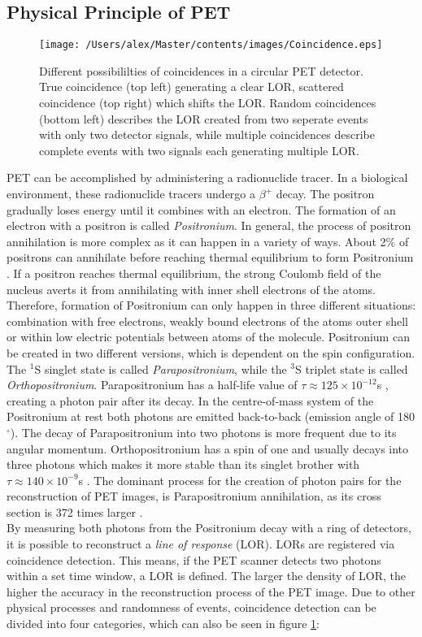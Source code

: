\subsection{Physical Principle of PET}
\begin{figure}[htp]
\centering
\texttt{[image: /Users/alex/Master/contents/images/Coincidence.eps]}
\vspace{1cm}
\caption{Different possibililties of coincidences in a circular PET detector. True coincidence (top left) generating a clear LOR, scattered coincidence (top right) which shifts the LOR. Random coincidences (bottom left) describes the LOR created from two seperate events with only two detector signals, while multiple coincidences describe complete events with two signals each generating multiple LOR.}
\label{fig:coincidence}
\end{figure}
PET can be accomplished by administering a radionuclide tracer. In a biological environment, these radionuclide tracers undergo a $\beta^+$ decay. The positron gradually loses energy until it combines with an electron. The formation of an electron with a positron is called \textit{Positronium}. In general, the process of positron annihilation is more complex as it can happen in a variety of ways. About 2\% of positrons can annihilate before reaching thermal equilibrium to form Positronium \cite{Heitler}. If a positron reaches thermal equilibrium, the strong Coulomb field of the nucleus averts it from annihilating with inner shell electrons of the atoms. Therefore, formation of Positronium can only happen in three different situations: combination with free electrons, weakly bound electrons of the atoms outer shell or within low electric potentials between atoms of the molecule. Positronium can be created in two different versions, which is dependent on the spin configuration. The $^1$S singlet state is called \textit{Parapositronium}, while the $^3$S triplet state is called \textit{Orthopositronium}. Parapositronium has a half-life value of $\tau  \approx 125 \times 10^{-12}$s \cite{PDG}, creating a photon pair after its decay. In the centre-of-mass system of the Positronium at rest both photons are emitted back-to-back (emission angle of 180$^\circ$). The decay of Parapositronium into two photons is more frequent due to its angular momentum. Orthopositronium has a spin of one and usually decays into three photons which makes it more stable than its singlet brother with $\tau  \approx 140 \times 10^{-9}$s \cite{PDG}. The dominant process for the creation of photon pairs for the reconstruction of PET images, is Parapositronium annihilation, as its cross section is 372 times larger \cite{Musiol}.\\By measuring both photons from the Positronium decay with a ring of detectors, it is possible to reconstruct a \textit{line of response} (LOR). LORs are registered via coincidence detection. This means, if the PET scanner detects two photons within a set time window, a LOR is defined. The larger the density of LOR, the higher the accuracy in the reconstruction process of the PET image. Due to other physical processes and randomness of events, coincidence detection can be divided into four categories, which can also be seen in figure \ref{fig:coincidence}:

